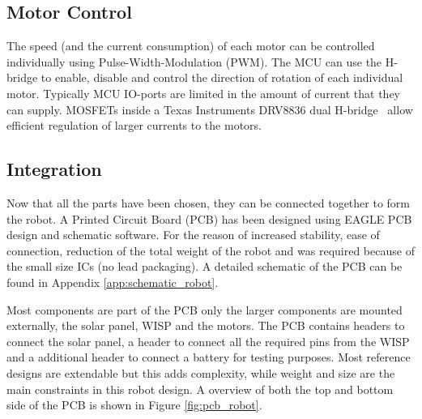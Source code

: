 \subsection{Motor Control}
\label{sec:dai_motor_control}

The speed (and the current consumption) of each motor can be controlled individually using Pulse-Width-Modulation (PWM).
The MCU can use the H-bridge to enable, disable and control the direction of rotation of each individual motor.
Typically MCU IO-ports are limited in the amount of current that they can supply.
MOSFETs inside a Texas Instruments DRV8836 dual H-bridge~\cite{drv8836_2017} allow efficient regulation of larger currents to the motors.

\subsection{Integration}

Now that all the parts have been chosen, they can be connected together to form the robot.
A Printed Circuit Board (PCB) has been designed using EAGLE PCB design and schematic software.
For the reason of increased stability, ease of connection, reduction of the total weight of the robot and was required because of the small size ICs (no lead packaging).
A detailed schematic of the PCB can be found in Appendix \ref{app:schematic_robot}.

Most components are part of the PCB only the larger components are mounted externally, the solar panel, WISP and the motors.
The PCB contains headers to connect the solar panel, a header to connect all the required pins from the WISP and a additional header to connect a battery for testing purposes.
Most reference designs are extendable but this adds complexity, while weight and size are the main constraints in this robot design.
A overview of both the top and bottom side of the PCB is shown in Figure \ref{fig:pcb_robot}.



